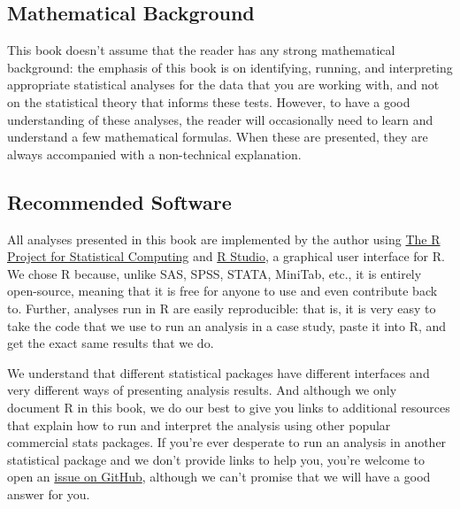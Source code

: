 \begin{preface}
\subsection{Mathematical Background}
This book doesn't assume that the reader has any strong mathematical background: the emphasis of this book is on identifying, running, and interpreting appropriate statistical analyses for the data that you are working with, and not on the statistical theory that informs these tests. However, to have a good understanding of these analyses, the reader will occasionally need to learn and understand a few mathematical formulas. When these are presented, they are always accompanied with a non-technical explanation.

\subsection{Recommended Software}
All analyses presented in this book are implemented by the author using \href{http://cran.r-project.org/mirrors.html}{The R Project for Statistical Computing} and \href{http://rstudio.com/}{R Studio}, a graphical user interface for R. We chose R because, unlike SAS, SPSS, STATA, MiniTab, etc., it is entirely open-source, meaning that it is free for anyone to use and even contribute back to. Further, analyses run in R are easily reproducible: that is, it is very easy to take the code that we use to run an analysis in a case study, paste it into R, and get the exact same results that we do.

We understand that different statistical packages have different interfaces and very different ways of presenting analysis results. And although we only document R in this book, we do our best to give you links to additional resources that explain how to run and interpret the analysis using other popular commercial stats packages. If you're ever desperate to run an analysis in another statistical package and we don't provide links to help you, you're welcome to open an \href{https://github.com/faulconbridge/appliedStats/issues}{issue on GitHub}, although we can't promise that we will have a good answer for you.


\end{preface}

